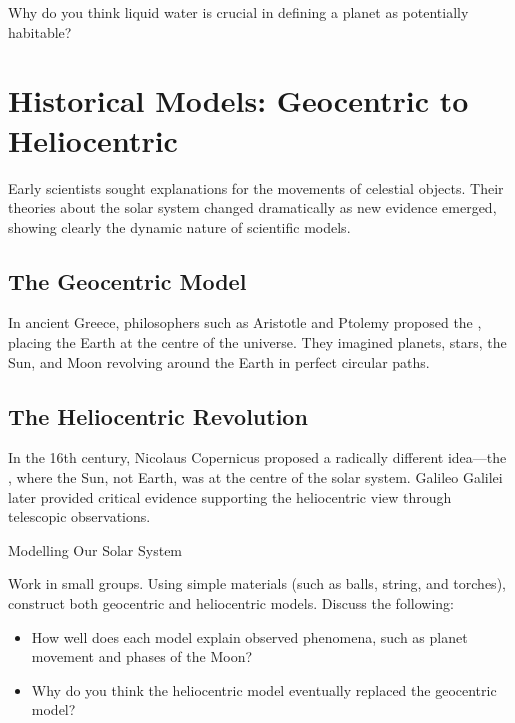 
\begin{stopandthink}
Why do you think liquid water is crucial in defining a planet as potentially habitable?
\end{stopandthink}

\section{Historical Models: Geocentric to Heliocentric}

Early scientists sought explanations for the movements of celestial objects. Their theories about the solar system changed dramatically as new evidence emerged, showing clearly the dynamic nature of scientific models.

\subsection{The Geocentric Model}

In ancient Greece, philosophers such as Aristotle and Ptolemy proposed the , placing the Earth at the centre of the universe. They imagined planets, stars, the Sun, and Moon revolving around the Earth in perfect circular paths.


\subsection{The Heliocentric Revolution}

In the 16th century, Nicolaus Copernicus proposed a radically different idea—the , where the Sun, not Earth, was at the centre of the solar system. Galileo Galilei later provided critical evidence supporting the heliocentric view through telescopic observations.


\begin{investigation}{Modelling Our Solar System}

Work in small groups. Using simple materials (such as balls, string, and torches), construct both geocentric and heliocentric models. Discuss the following:

\begin{itemize}
    \item How well does each model explain observed phenomena, such as planet movement and phases of the Moon?
    \item Why do you think the heliocentric model eventually replaced the geocentric model?
\end{itemize}
\end{investigation}

